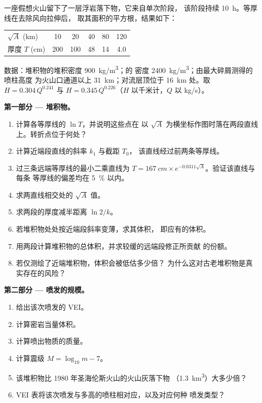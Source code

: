 \begin{problem}
\label{pb:b2:eruptive-styles:1}
一座假想火山留下了一层浮岩落下物，它来自单次阶段，
该阶段持续 \qty{10}{\hour}。等厚线在去除风向拉伸后，
取其面积的平方根，结果如下：
\begin{center}
\small
\begin{tabular}{lccccc}
\hline
$\sqrt A$ (\unit{km}) & 10 & 20 & 40 & 80 & 120 \\
厚度 $T$ (\unit{cm}) & 200 & 100 & 48 & 14 & 4.0 \\
\hline
\end{tabular}
\end{center}
数据：堆积物的堆积密度 \qty{900}{kg/m^3}；的
密度 \qty{2400}{kg/m^3}；由最大碎屑测得的喷柱高度
为火山口通道以上 \qty{31}{km}；对流层顶位于 \qty{16}{km} 处。取 $H =
0.304\,Q^{0.241}$ 与 $H = 0.345\,Q^{0.226}$（$H$ 以千米计，$Q$ 以
\unit{kg/s}）。

\medskip\noindent\textbf{第一部分 --- 堆积物。}
\begin{enumerate}
\item 计算各等厚线的 $\ln T$，并说明这些点在
以 $\sqrt A$ 为横坐标作图时落在两段直线上。转折点位于何处？
\item 计算近端段直线的斜率 $k_1$ 与截距 $T_0$，
该直线经过前两条等厚线。
\item 过三条远端等厚线的最小二乘直线为 $T =
\qty{167}{cm}\times e^{-0.0311\sqrt A}$。验证该直线与每条
等厚线的偏差均在 \qty{5}{\percent} 以内。
\item 求两直线相交处的 $\sqrt A$ 值。
\item 求两段的厚度减半距离 $\ln 2/k$。
\item 若堆积物处处按近端段斜率变薄，求其体积，
即应有的体积。
\item 用两段计算堆积物的总体积，并求较缓的远端段修正所贡献
的份额。
\item 若仅测绘了近端堆积物，体积会被低估多少倍？
为什么这对古老堆积物是真实存在的风险？
\end{enumerate}

\noindent\textbf{第二部分 --- 喷发的规模。}
\begin{enumerate}[resume]
\item 给出该次喷发的 VEI。
\item 计算密岩当量体积。
\item 计算喷出物质的质量。
\item 计算震级 $M = \log_{10}m - 7$。
\item 该堆积物比 1980 年圣海伦斯火山的火山灰落下物
（\qty{1.3}{km^3}）大多少倍？
\item VEI 表将该次喷发与多高的喷柱相对应，以及对应何种
喷发类型？
\end{enumerate}


\end{problem}
